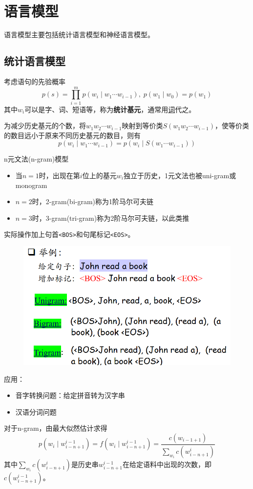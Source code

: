
\section{语言模型}
语言模型主要包括统计语言模型和神经语言模型。

\subsection{统计语言模型}
考虑语句的先验概率
\[p(s)=\prod_{i=1}^{m}p(w_i\mid w_1\cdots w_{i-1}),\;p(w_1\mid w_0)=p(w_1)\]
其中$w_i$可以是字、词、短语等，称为\textbf{统计基元}，通常用\underline{词}代之。

为减少历史基元的个数，将$w_1w_2\cdots w_{i-1}$映射到等价类$S(w_1w_2\cdots w_{i-1})$，使等价类的数目远小于原来不同历史基元的数目，则有
\[p(w_i\mid w_1\cdots w_{i-1})=p(w_i\mid S(w_1\cdots w_{i-1}))\]

n元文法(n-gram)模型
\begin{itemize}
	\item 当$n=1$时，出现在第$i$位上的基元$w_i$独立于历史，1元文法也被uni-gram或monogram
	\item $n=2$时，2-gram(bi-gram)称为1阶马尔可夫链
	\item $n=3$时，3-gram(tri-gram)称为2阶马尔可夫链，以此类推
\end{itemize}
实际操作加上句首\verb'<BOS>'和句尾标记\verb'<EOS>'。
\begin{figure}[H]
\centering
\includegraphics[width=0.6\linewidth]{fig/n-gram.png}
\end{figure}

应用：
\begin{itemize}
	\item 音字转换问题：给定拼音转为汉字串
	\item 汉语分词问题
\end{itemize}

对于n-gram，由最大似然估计求得
\[p(w_i\mid w_{i-n+1}^{i-1})=f(w_i\mid w_{i-n+1}^{i-1})=\frac{c(w_{i-1+1})}{\sum_{w_i}c(w_{i-n+1}^i)}\]
其中$\sum_{w_i}c(w_{i-n+1}^i)$是历史串$w_{i-n+1}^{i-1}$在给定语料中出现的次数，即$c(w_{i-n+1}^{i-1})$。

